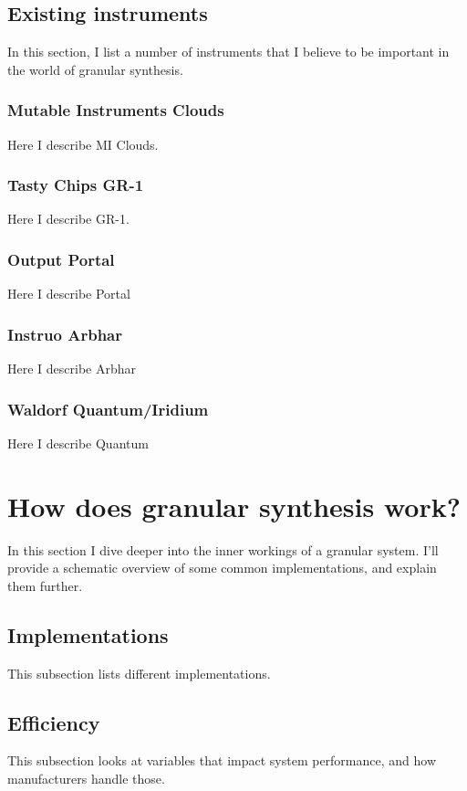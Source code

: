 \documentclass[12pt, IEEEtran]{article}
\begin{document}
\subsection{Existing instruments}
In this section, I list a number of instruments that I believe to be important in the world of granular synthesis.

\subsubsection{Mutable Instruments Clouds}
Here I describe MI Clouds.

\subsubsection{Tasty Chips GR-1}
Here I describe GR-1.

\subsubsection{Output Portal}
Here I describe Portal

\subsubsection{Instruo Arbhar}
Here I describe Arbhar

\subsubsection{Waldorf Quantum/Iridium}
Here I describe Quantum


\section{How does granular synthesis work?}
In this section I dive deeper into the inner workings of a granular system. I'll provide a schematic overview of some common implementations, and explain them further.

\subsection{Implementations}
This subsection lists different implementations.

\subsection{Efficiency}
This subsection looks at variables that impact system performance, and how manufacturers handle those.
\end{document}
